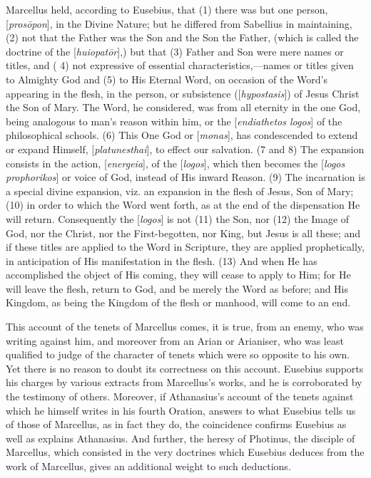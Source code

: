 Marcellus held, according to Eusebius, that (1)
there was but one person, [\emph{pros\={o}pon}], in the
Divine Nature; but he differed from Sabellius in maintaining, (2) not
that the Father was the Son and the Son the Father, (which is called
the doctrine of the [\emph{huiopat\={o}r}],) but that (3) Father
and Son were mere names or titles, and ( 4) not expressive of
essential characteristics,—names or titles given to Almighty God and
(5) to His Eternal Word, on occasion of the Word's appearing in the
flesh, in the person, or subsistence ([\emph{hypostasis}]) of Jesus
Christ the Son of Mary. The Word, he considered, was from all eternity
in the one God, being analogous to man's reason within him, or the [\emph{endiathetos
logos}] of the philosophical schools. (6) This One God or [\emph{monas}],
has condescended to extend or expand Himself, [\emph{platunesthai}],
to effect our salvation. (7 and 8) The expansion consists in the
action, [\emph{energeia}], of the [\emph{logos}], which then becomes
the [\emph{logos prophorikos}] or voice of God, instead of His inward
Reason. (9) The incarnation is a special divine expansion, viz. an
expansion in the flesh of Jesus, Son of Mary; (10) in order to which
the Word went forth, as at the end of the dispensation He will return.
Consequently the [\emph{logos}] is not (11) the Son, nor (12) the
Image of God, nor the Christ, nor the First-begotten, nor King, but
Jesus is all these; and if these titles are applied to the Word in
Scripture, they are applied prophetically, in anticipation of His
manifestation in the flesh. (13) And when He has accomplished the
object of His coming, they will cease to apply to Him; for He will
leave the flesh, return to God, and be merely the Word as before; and
His Kingdom, as being the Kingdom of the flesh or manhood, will
come to an end.

This account of the tenets of Marcellus comes, it
is true, from an enemy, who was writing against him, and moreover from
an Arian or Arianiser, who was least qualified to judge of the
character of tenets which were so opposite to his own. Yet there is no
reason to doubt its correctness on this account. Eusebius supports his
charges by various extracts from Marcellus's works, and he is
corroborated by the testimony of others. Moreover, if Athanasius's
account of the tenets against which he himself writes in his fourth
Oration, answers to what Eusebius tells us of those of Marcellus, as
in fact they do, the coincidence confirms Eusebius as well as explains
Athanasius. And further, the heresy of Photinus, the disciple of
Marcellus, which consisted in the very doctrines which Eusebius
deduces from the work of Marcellus, gives an additional weight to such
deductions.


